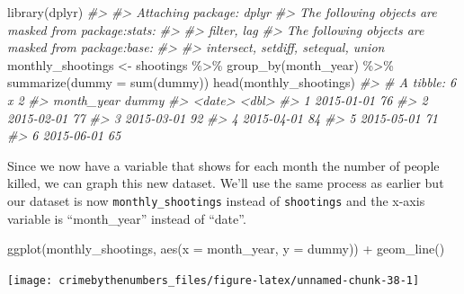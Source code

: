\documentclass[
]{krantz}
\makeatletter
\newenvironment{Shaded}{\begin{snugshade}}{\end{snugshade}}
\newcommand{\AttributeTok}[1]{\textcolor[rgb]{0.61,0.61,0.61}{#1}}
\newcommand{\CommentTok}[1]{\textcolor[rgb]{0.37,0.37,0.37}{\textit{#1}}}
\newcommand{\FunctionTok}[1]{\textcolor[rgb]{0,0,0}{#1}}
\newcommand{\NormalTok}[1]{#1}
\newcommand{\OtherTok}[1]{\textcolor[rgb]{0.37,0.37,0.37}{#1}}
\newcommand{\SpecialCharTok}[1]{\textcolor[rgb]{0,0,0}{#1}}
\newenvironment{kframe}{%
\medskip{}
\setlength{\fboxsep}{.8em}
 \def\at@end@of@kframe{}%
 \ifinner\ifhmode%
  \def\at@end@of@kframe{\end{minipage}}%
  \begin{minipage}{\columnwidth}%
 \fi\fi%
 \def\FrameCommand##1{\hskip\@totalleftmargin \hskip-\fboxsep
 \colorbox{shadecolor}{##1}\hskip-\fboxsep
     \hskip-\linewidth \hskip-\@totalleftmargin \hskip\columnwidth}%
 \MakeFramed {\advance\hsize-\width
   \@totalleftmargin\z@ \linewidth\hsize
   \@setminipage}}%
 {\par\unskip\endMakeFramed%
 \at@end@of@kframe}
\renewenvironment{Shaded}{\begin{kframe}}{\end{kframe}}
\makeatother
\begin{document}
\begin{Shaded}
\begin{Highlighting}[]
\FunctionTok{library}\NormalTok{(dplyr)}
\CommentTok{\#\textgreater{} }
\CommentTok{\#\textgreater{} Attaching package: \textquotesingle{}dplyr\textquotesingle{}}
\CommentTok{\#\textgreater{} The following objects are masked from \textquotesingle{}package:stats\textquotesingle{}:}
\CommentTok{\#\textgreater{} }
\CommentTok{\#\textgreater{}     filter, lag}
\CommentTok{\#\textgreater{} The following objects are masked from \textquotesingle{}package:base\textquotesingle{}:}
\CommentTok{\#\textgreater{} }
\CommentTok{\#\textgreater{}     intersect, setdiff, setequal, union}
\NormalTok{monthly\_shootings }\OtherTok{\textless{}{-}}\NormalTok{ shootings }\SpecialCharTok{\%\textgreater{}\%} \FunctionTok{group\_by}\NormalTok{(month\_year) }\SpecialCharTok{\%\textgreater{}\%} \FunctionTok{summarize}\NormalTok{(}\AttributeTok{dummy =} \FunctionTok{sum}\NormalTok{(dummy))}
\FunctionTok{head}\NormalTok{(monthly\_shootings)}
\CommentTok{\#\textgreater{} \# A tibble: 6 x 2}
\CommentTok{\#\textgreater{}   month\_year dummy}
\CommentTok{\#\textgreater{}   \textless{}date\textgreater{}     \textless{}dbl\textgreater{}}
\CommentTok{\#\textgreater{} 1 2015{-}01{-}01    76}
\CommentTok{\#\textgreater{} 2 2015{-}02{-}01    77}
\CommentTok{\#\textgreater{} 3 2015{-}03{-}01    92}
\CommentTok{\#\textgreater{} 4 2015{-}04{-}01    84}
\CommentTok{\#\textgreater{} 5 2015{-}05{-}01    71}
\CommentTok{\#\textgreater{} 6 2015{-}06{-}01    65}
\end{Highlighting}
\end{Shaded}

Since we now have a variable that shows for each month the number of people killed, we can graph this new dataset. We'll use the same process as earlier but our dataset is now \texttt{monthly\_shootings} instead of \texttt{shootings} and the x-axis variable is ``month\_year'' instead of ``date''.

\begin{Shaded}
\begin{Highlighting}[]
\FunctionTok{ggplot}\NormalTok{(monthly\_shootings, }\FunctionTok{aes}\NormalTok{(}\AttributeTok{x =}\NormalTok{ month\_year, }\AttributeTok{y =}\NormalTok{ dummy)) }\SpecialCharTok{+}
  \FunctionTok{geom\_line}\NormalTok{()}
\end{Highlighting}
\end{Shaded}

\begin{center}\texttt{[image: crimebythenumbers\_files/figure-latex/unnamed-chunk-38-1]} \end{center}
\end{document}
